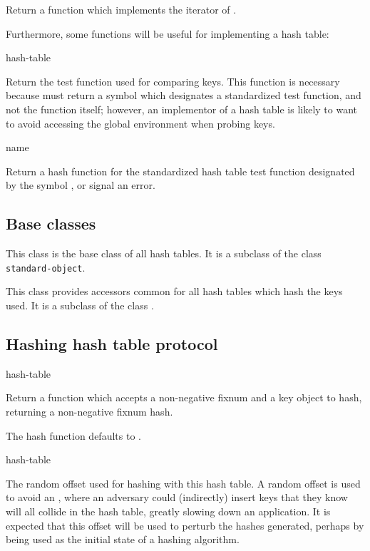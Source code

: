 Return a function which implements the iterator of
.

Furthermore, some functions will be useful for implementing a hash
table:

 {hash-table}

Return the test function used for comparing keys. This function is necessary
because  must return a symbol which designates a
standardized test function, and not the function itself; however, an
implementor of a hash table is likely to want to avoid accessing the global
environment when probing keys.

 {name}

Return a hash function for the standardized hash table test function
designated by the symbol , or signal an error.

\subsection{Base classes}


This class is the base class of all hash tables.  It is a subclass of
the class \texttt{standard-object}.


This class provides accessors common for all hash tables which hash
the keys used.  It is a subclass of the class .

\subsection{Hashing hash table protocol}

 {hash-table}


Return a function which accepts a non-negative fixnum 
and a key object to hash, returning a non-negative fixnum hash.

The hash function defaults to
.

 {hash-table}


The random offset used for hashing with this hash table.  A random
offset is used to avoid an , where
an adversary could (indirectly) insert keys that they know will all
collide in the hash table, greatly slowing down an application.  It is
expected that this offset will be used to perturb the hashes
generated, perhaps by being used as the initial state of a hashing
algorithm.

